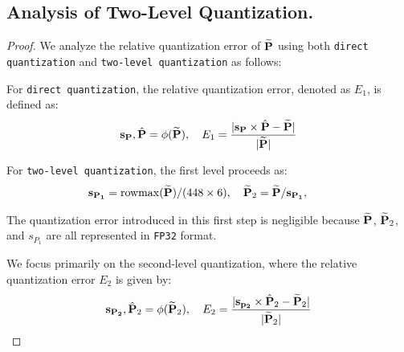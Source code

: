 \subsection{Analysis of Two-Level Quantization.} 
\begin{proof}

We analyze the relative quantization error of $\widetilde {\mathbf{P}}$ using both \texttt{direct quantization} and \texttt{two-level quantization} as follows:

For \texttt{direct quantization}, the relative quantization error, denoted as $E_1$, is defined as:
\begin{align}
    \mathbf{s_P}, \hat {\mathbf{P}} = \phi(\widetilde {\mathbf{P}}), ~~~ E_1 = \frac{|\mathbf{s_P} \times \hat {\mathbf{P}} - \widetilde {\mathbf{P}}|}{|\widetilde {\mathbf{P}}|}
    \label{err_1}
\end{align}



For \texttt{two-level quantization}, the first level proceeds as:
\begin{align*}
    \mathbf{s_{P_1}} = \mathrm{rowmax}(\widetilde {\mathbf{P}}) / (448 \times 6), ~~~
     \widetilde {\mathbf{P}}_2 &= \widetilde {\mathbf{P}} / \mathbf{s_{P_1}}, ~~~
\end{align*}

The quantization error introduced in this first step is negligible because $\widetilde {\mathbf{P}}$, $\widetilde{\mathbf{P}}_2$, and $s_{P_1}$ are all represented in \texttt{FP32} format.

We focus primarily on the second-level quantization, where the relative quantization error $E_2$ is given by:
\begin{align}
     \mathbf{s_{P_2}}, \hat {\mathbf{P}}_2 = \phi (\widetilde {\mathbf{P}}_2),~~~
     E_2 = \frac{|\mathbf{s_{p_2}} \times \hat {\mathbf{P}}_2 - \widetilde {\mathbf{P}}_2|}{|\widetilde {\mathbf{P}}_2|}
     \label{err_2}
\end{align}



\end{proof}
